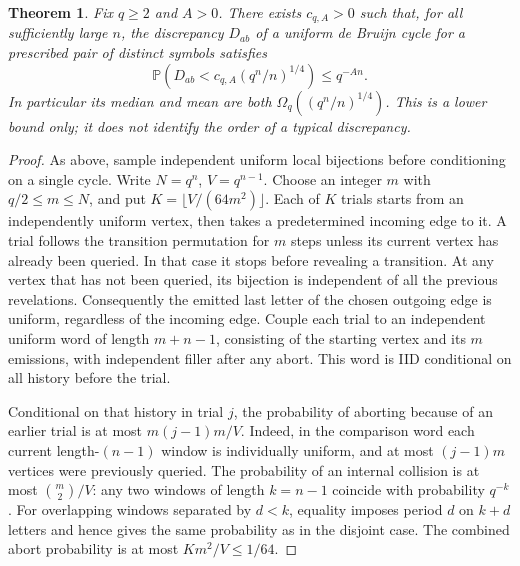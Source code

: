 \documentclass[11pt]{article}
\newtheorem{theorem}{Theorem}
\begin{document}
\begin{theorem}
Fix \(q\ge2\) and \(A>0\). There exists \(c_{q,A}>0\) such that,
for all sufficiently large \(n\), the discrepancy \(D_{ab}\) of
a uniform de Bruijn cycle for a prescribed pair of distinct
symbols satisfies
\[
 {\mathbb P}\left(D_{ab}<c_{q,A}(q^n/n)^{1/4}\right)
 \le q^{-An}.
\]
In particular its median and mean are both
\(\Omega_q((q^n/n)^{1/4})\). This is a lower bound only; it
does not identify the order of a typical discrepancy.
\end{theorem}
\begin{proof}
As above, sample independent uniform local bijections before
conditioning on a single cycle. Write \(N=q^n\), \(V=q^{n-1}\).
Choose an integer \(m\) with \(q/2\le m\le N\), and put
\(K=\lfloor V/(64m^2)\rfloor\).
Each of \(K\) trials starts from an independently uniform vertex,
then takes a predetermined incoming edge to it. A trial follows
the transition permutation for \(m\) steps unless its current
vertex has already been queried. In that case it stops before
revealing a transition. At any vertex that has not been queried,
its bijection is independent of all the previous revelations.
Consequently the emitted last letter of the chosen outgoing
edge is uniform, regardless of the incoming edge. Couple each
trial to an independent uniform word of length \(m+n-1\),
consisting of the starting vertex and its \(m\) emissions,
with independent filler after any abort. This word is IID
conditional on all history before the trial.

Conditional on that history in trial \(j\), the probability of
aborting because of an earlier trial is at most
\(m(j-1)m/V\). Indeed, in the comparison word each current
length-\((n-1)\) window is individually uniform, and at most
\((j-1)m\) vertices were previously queried. The probability
of an internal collision is at most \(\binom m2/V\): any two
windows of length \(k=n-1\) coincide with probability \(q^{-k}\).
For overlapping windows separated by \(d<k\), equality imposes
period \(d\) on \(k+d\) letters and hence gives the same
probability as in the disjoint case. The combined abort
probability is at most \(Km^2/V\le 1/64\).


\end{proof}
\end{document}
